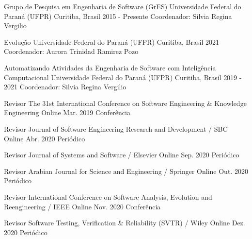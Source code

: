 



\begin{cventries}

	\cventry
	{Grupo de Pesquisa em Engenharia de Software (GrES)} %
	{Universidade Federal do Paraná (UFPR)}
	{Curitiba, Brasil} %
	{2015 - Presente} %
	{
		Coordenador: Silvia Regina Vergilio
	}

 	\cventry
	{Evolução} %
	{Universidade Federal do Paraná (UFPR)}
	{Curitiba, Brasil} %
	{2021} %
	{
		Coordenador: Aurora Trinidad Ramirez Pozo
	}
\end{cventries}



\begin{cventries}
	
	\cventry
	{Automatizando Atividades da Engenharia de Software com Inteligência Computacional} %
	{Universidade Federal do Paraná (UFPR)}
	{Curitiba, Brasil} %
	{2019 - 2021} %
	{	 
		Coordenador: Silvia Regina Vergilio
	}
	
	
	\cventry
	{Revisor} %
	{The 31st International Conference on Software Engineering \& Knowledge Engineering}
	{Online} %
	{Mar. 2019} %
	{Conferência}

	\cventry
	{Revisor} %
	{Journal of Software Engineering Research and Development / SBC}
	{Online} %
	{Abr. 2020} %
	{Periódico}
	
	\cventry
	{Revisor} %
	{Journal of Systems and Software / Elsevier}
	{Online} %
	{Sep. 2020} %
	{Periódico}
	
	
	\cventry
	{Revisor} %
	{Arabian Journal for Science and Engineering / Springer}
	{Online} %
	{Out. 2020} %
	{Periódico}
	
	\cventry
	{Revisor} %
	{International Conference on Software Analysis, Evolution and Reengineering / IEEE}
	{Online} %
	{Nov. 2020} %
	{Conferência}
	
	\cventry
	{Revisor} %
	{Software Testing, Verification \& Reliability (SVTR) / Wiley}
	{Online} %
	{Dez. 2020} %
	{Periódico}
\end{cventries}

